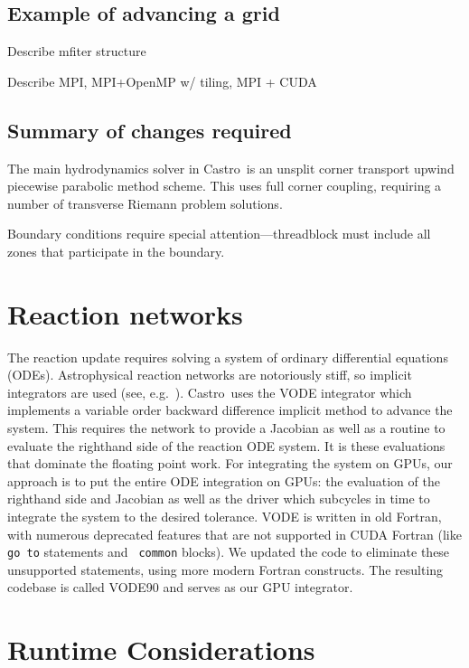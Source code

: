 \documentclass[preprint,times]{aastex62}
\newcommand{\castro}{{\sf Castro}}
\newcommand{\MarginPar}[1]{\marginpar{\vskip-\baselineskip\raggedright\tiny\sffamily\hrule\smallskip{\color{red}#1}\par\smallskip\hrule}}
\begin{document}
\subsection{Example of advancing a grid}

Describe mfiter structure

Describe MPI, MPI+OpenMP w/ tiling, MPI + CUDA


\subsection{Summary of changes required}

The main hydrodynamics solver in \castro\ is an unsplit corner
transport upwind \citep{ppmunsplit} piecewise parabolic method
\citep{ppm} scheme.  This uses full corner coupling, requiring a
number of transverse Riemann problem solutions.


Boundary conditions require special attention---threadblock must include
all zones that participate in the boundary.

\section{Reaction networks}

The reaction update requires solving a system of ordinary differential
equations (ODEs).  Astrophysical reaction networks are notoriously
stiff, so implicit integrators are used (see,
e.g.\ \citealt{timmes:1999}).  \castro\ uses the VODE integrator
\citep{vode} which implements a variable order backward difference
implicit method to advance the system.  This requires the network to
provide a Jacobian as well as a routine to evaluate the righthand side
of the reaction ODE system.  It is these evaluations that dominate the
floating point work.  For integrating the system on GPUs, our approach
is to put the entire ODE integration on GPUs: the evaluation of the
righthand side and Jacobian as well as the driver which subcycles in
time to integrate the system to the desired tolerance.  VODE is
written in old Fortran, with numerous deprecated features that are not
supported in CUDA Fortran (like {\tt go to} statements and {\tt
  common} blocks).  We updated the code to eliminate these unsupported
statements, using more modern Fortran constructs.  The resulting
codebase is called VODE90 and serves as our GPU integrator.  \MarginPar{more here from Don}


\section{Runtime Considerations}
\end{document}

